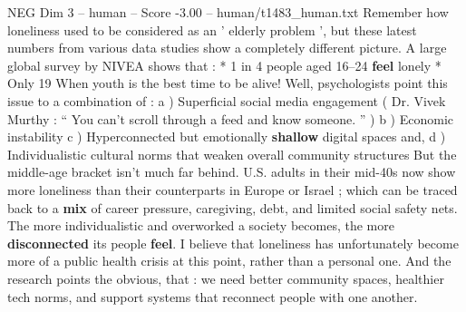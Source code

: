 \begin{textsample}{NEG Dim 3 – human – Score -3.00 – human/t1483\_human.txt}  \label{ex:f3_neg_032}
Remember how loneliness used to be considered as an ' elderly problem ', but these latest numbers from various data studies show a completely different picture.
A large global survey by NIVEA shows that : * 1 in 4 people aged 16–24 \textbf{feel} lonely * Only 19 %
When youth is the best time to be alive!
Well, psychologists point this issue to a combination of : a ) Superficial social media engagement ( Dr.
Vivek Murthy : “ You can't scroll through a feed and know someone. ” ) b ) Economic instability c ) Hyperconnected but emotionally \textbf{shallow} digital spaces and, d ) Individualistic cultural norms that weaken overall community structures But the middle-age bracket isn't much far behind.
U.S. adults in their mid-40s now show more loneliness than their counterparts in Europe or Israel ; which can be traced back to a \textbf{mix} of career pressure, caregiving, debt, and limited social safety nets.
The more individualistic and overworked a society becomes, the more \textbf{disconnected} its people \textbf{feel}.
I believe that loneliness has unfortunately become more of a public health crisis at this point, rather than a personal one.
And the research points the obvious, that : we need better community spaces, healthier tech norms, and support systems that reconnect people with one another.

\end{textsample}
